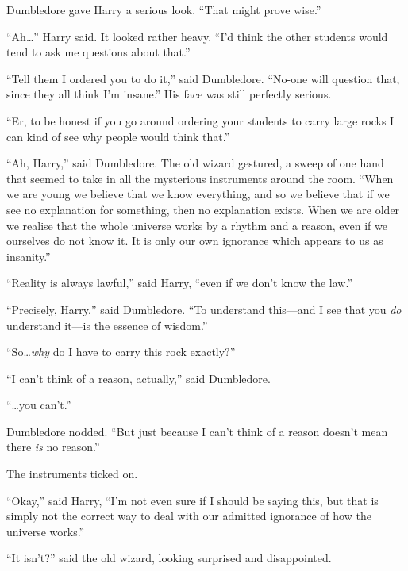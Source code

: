Dumbledore gave Harry a serious look.
“That might prove wise.”

“Ah…” Harry said. It looked rather heavy.
“I’d think the other students would tend to ask me questions about that.”

“Tell them I ordered you to do it,” said Dumbledore.
“No-one will question that, since they all think I’m insane.” His face was still perfectly serious.

“Er, to be honest if you go around ordering your students to carry large rocks I can kind of see why people would think that.”

“Ah, Harry,” said Dumbledore. The old wizard gestured, a sweep of one hand that seemed to take in all the mysterious instruments around the room.
“When we are young we believe that we know everything, and so we believe that if we see no explanation for something, then no explanation exists. When we are older we realise that the whole universe works by a rhythm and a reason, even if we ourselves do not know it. It is only our own ignorance which appears to us as insanity.”

“Reality is always lawful,” said Harry, “even if we don’t know the law.”

“Precisely, Harry,” said Dumbledore.
“To understand this—and I see that you \emph{do} understand it—is the essence of wisdom.”

“So…\emph{why} do I have to carry this rock exactly?”

“I can’t think of a reason, actually,” said Dumbledore.

“…you can’t.”

Dumbledore nodded.
“But just because I can’t think of a reason doesn’t mean there \emph{is} no reason.”

The instruments ticked on.

“Okay,” said Harry,
“I’m not even sure if I should be saying this, but that is simply not the correct way to deal with our admitted ignorance of how the universe works.”

“It isn’t?” said the old wizard, looking surprised and disappointed.


